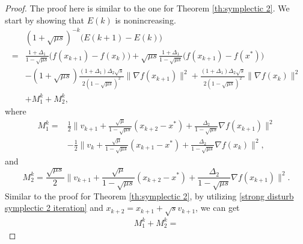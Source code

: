 \documentclass[11pt]{article}
\newcommand{\1}{\mathbf 1}
\numberwithin{equation}{section}
\begin{document}
\begin{proof}
    {The proof here is similar to the one for Theorem \ref{th:symplectic 2}. We start by showing that $E(k)$ is nonincreasing. 
        \begin{equation}
        \label{eq: diffEk in modified symplectic discretization}
        \begin{aligned}
        &(1+\sqrt{\mu s})^{-k}\big(E(k+1)-E(k)\big)\\
        =&\frac{1+\Delta_1}{1-\sqrt{\mu s}}\big(f(x_{k+1})-f(x_k)\big)+\sqrt{\mu s}\frac{1+\Delta_1}{1-\sqrt{\mu s}}\big(f(x_{k+1})-f(x^*)\big)\\
		&-(1+\sqrt{\mu s})\frac{(1+\Delta_1)\Delta_2\sqrt{s}}{2(1-\sqrt{\mu s})^2}\|\nabla f(x_{k+1})\|^2+\frac{(1+\Delta_1)\Delta_2\sqrt{s}}{2(1-\sqrt{\mu s})^2}\|\nabla f(x_k)\|^2\\
        &+M_1^k+M_2^k,
        \end{aligned}
        \end{equation}
        where 
        \begin{equation*}
        \begin{aligned}
            M_1^k={}&\frac{1}{2}\|v_{k+1}+\frac{\sqrt{\mu}}{1-\sqrt{\mu s}}(x_{k+2} -x^*)+\frac{\Delta_2}{1-\sqrt{\mu s}}\nabla f(x_{k+1})\|^2 \\
            {}&-\frac{1}{2}\|v_k+\frac{\sqrt{\mu}}{1-\sqrt{\mu s}}(x_{k+1}-x^*)+\frac{\Delta_2}{1-\sqrt{\mu s}}\nabla f(x_k)\|^2,
        \end{aligned}
        \end{equation*}
        and 
        \begin{equation*}
            M_2^k=\frac{\sqrt{\mu s}}{2}\|v_{k+1}+\frac{\sqrt{\mu}}{1-\sqrt{\mu s}}(x_{k+2}-x^*)+\frac{\Delta_2}{1-\sqrt{\mu s}}\nabla f(x_{k+1})\|^2.
        \end{equation*}
        Similar to the proof for Theorem \ref{th:symplectic 2}, 
        by utilizing \eqref{strong disturb symplectic 2 iteration} and $x_{k+2}=x_{k+1}+\sqrt{s}v_{k+1}$, we can get
        \begin{align*}
        M_1^k+M_2^k = 

\end{align*}}
\end{proof}
\end{document}
